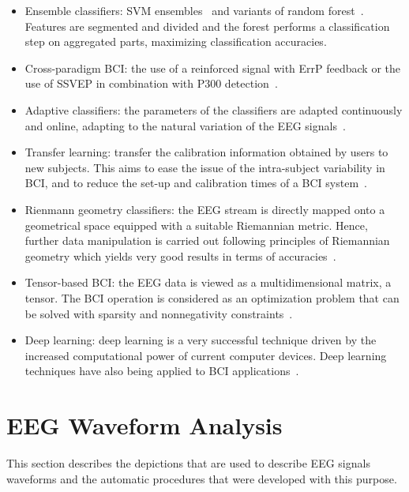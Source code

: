 \begin{itemize}
\item Ensemble classifiers: SVM ensembles~\cite{Rakotomamonjy2008} and variants of random forest~\cite{Steyrl2015}.  Features are segmented and divided and the forest performs a classification step on aggregated parts, maximizing classification accuracies.
\item Cross-paradigm BCI: the use of a reinforced signal with ErrP feedback or the use of SSVEP in combination with P300 detection~\cite{Lotte2018}.
\item Adaptive classifiers: the parameters of the classifiers are adapted continuously and online,  adapting to the natural variation of the EEG signals~\cite{Lotte2018}.
\item Transfer learning: transfer the calibration information obtained by users to new subjects.  This aims to ease the issue of the intra-subject variability in BCI, and to reduce the set-up and calibration times of a BCI system~\cite{Zanini2018}.
\item Rienmann geometry classifiers: the EEG stream is directly mapped onto a geometrical space equipped with a suitable Riemannian metric.  Hence, further data manipulation is carried out following principles of Riemannian geometry which yields very good results in terms of accuracies~\cite{Zanini2018}.
\item Tensor-based BCI:  the EEG data is viewed as a multidimensional matrix, a tensor.  The BCI operation is considered as an optimization problem that can be solved with sparsity and nonnegativity constraints~\cite{Vincent2010,Cichocki2008}.
\item Deep learning: deep learning is a very successful technique driven by the increased computational power of current computer devices.  Deep learning techniques have also being applied to BCI applications~\cite{Tjepkema-Cloostermans2018}.
\end{itemize}


\section{EEG Waveform Analysis}

This section describes the depictions that are used to describe EEG signals waveforms and the automatic procedures that were developed with this purpose.

